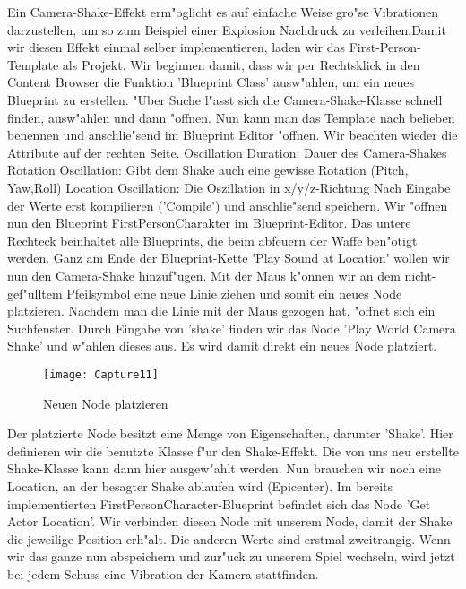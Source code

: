 \documentclass[11pt, titlepage]{article}
\begin{document}
\noindent Ein Camera-Shake-Effekt erm"oglicht es auf einfache Weise gro"se Vibrationen darzustellen, um so zum Beispiel einer Explosion Nachdruck zu verleihen.Damit wir diesen Effekt einmal selber implementieren, laden wir das First-Person-Template als Projekt. \newline
\newline
\noindent Wir beginnen damit, dass wir per Rechtsklick in den Content Browser die Funktion 'Blueprint Class' ausw"ahlen, um ein neues Blueprint zu erstellen. "Uber Suche l"asst sich die Camera-Shake-Klasse schnell finden, ausw"ahlen und dann "offnen. Nun kann man das Template nach belieben benennen und anschlie"send im Blueprint Editor "offnen. Wir beachten wieder die Attribute auf der rechten Seite. \newline
\newline
\noindent Oscillation Duration: Dauer des Camera-Shakes \newline
\noindent Rotation Oscillation: Gibt dem Shake auch eine gewisse Rotation (Pitch, Yaw,Roll) \newline
\noindent Location Oscillation: Die Oszillation in x/y/z-Richtung \newline
\newline
\noindent Nach Eingabe der Werte erst kompilieren ('Compile') und anschlie"send speichern. \newpage
\noindent Wir "offnen nun den Blueprint FirstPersonCharakter im Blueprint-Editor. Das untere Rechteck beinhaltet alle Blueprints, die beim abfeuern der Waffe ben"otigt werden. Ganz am Ende der Blueprint-Kette 'Play Sound at Location' wollen wir nun den Camera-Shake hinzuf"ugen. Mit der Maus k"onnen wir an dem nicht-gef"ulltem Pfeilsymbol eine neue Linie ziehen und somit ein neues Node platzieren. Nachdem man die Linie mit der Maus gezogen hat, "offnet sich ein Suchfenster. Durch Eingabe von 'shake' finden wir das Node 'Play World Camera Shake' und w"ahlen dieses aus. Es wird damit direkt ein neues Node platziert.

\begin{figure}[h]
\texttt{[image: Capture11]}
\caption{Neuen Node platzieren}
\end{figure}

\noindent Der platzierte Node besitzt eine Menge von Eigenschaften, darunter 'Shake'. Hier definieren wir die benutzte Klasse f"ur den Shake-Effekt. Die von uns neu erstellte Shake-Klasse kann dann hier ausgew"ahlt werden. Nun brauchen wir noch eine Location, an der besagter Shake ablaufen wird (Epicenter). Im bereits implementierten FirstPersonCharacter-Blueprint befindet sich das Node 'Get Actor Location'. Wir verbinden diesen Node mit unserem Node, damit der Shake die jeweilige Position erh"alt. Die anderen Werte sind erstmal zweitrangig. \newline
\noindent Wenn wir das ganze nun abspeichern und zur"uck zu unserem Spiel wechseln, wird jetzt bei jedem Schuss eine Vibration der Kamera stattfinden.
\newpage
\end{document}
